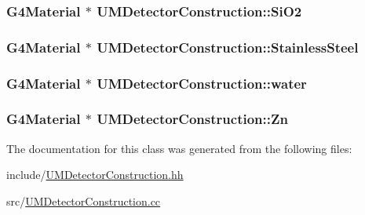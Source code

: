 \subsubsection[{Si\+O2}]{\setlength{\rightskip}{0pt plus 5cm}G4\+Material $\ast$ U\+M\+Detector\+Construction\+::\+Si\+O2\hspace{0.3cm}{\ttfamily [private]}}\label{classUMDetectorConstruction_ac58b487a35d977148b5fae507a29bb1f}
\hypertarget{classUMDetectorConstruction_a6102b1f41a169fa4663c3254e2f09e28}{}
\subsubsection[{Stainless\+Steel}]{\setlength{\rightskip}{0pt plus 5cm}G4\+Material $\ast$ U\+M\+Detector\+Construction\+::\+Stainless\+Steel\hspace{0.3cm}{\ttfamily [private]}}\label{classUMDetectorConstruction_a6102b1f41a169fa4663c3254e2f09e28}
\hypertarget{classUMDetectorConstruction_ac5dda74afd06dbe0374ced4f64e97fd3}{}
\subsubsection[{water}]{\setlength{\rightskip}{0pt plus 5cm}G4\+Material $\ast$ U\+M\+Detector\+Construction\+::water\hspace{0.3cm}{\ttfamily [private]}}\label{classUMDetectorConstruction_ac5dda74afd06dbe0374ced4f64e97fd3}
\hypertarget{classUMDetectorConstruction_a0e70836f696d4e8f6b749114e2a79ecf}{}
\subsubsection[{Zn}]{\setlength{\rightskip}{0pt plus 5cm}G4\+Material $\ast$ U\+M\+Detector\+Construction\+::\+Zn\hspace{0.3cm}{\ttfamily [private]}}\label{classUMDetectorConstruction_a0e70836f696d4e8f6b749114e2a79ecf}


The documentation for this class was generated from the following files\+:\begin{DoxyCompactItemize}
\item 
include/\hyperlink{UMDetectorConstruction_8hh}{U\+M\+Detector\+Construction.\+hh}\item 
src/\hyperlink{UMDetectorConstruction_8cc}{U\+M\+Detector\+Construction.\+cc}\end{DoxyCompactItemize}
